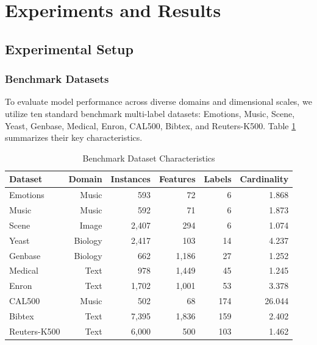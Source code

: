 \documentclass[conference]{IEEEtran}
\begin{document}
\section{Experiments and Results}

\subsection{Experimental Setup}
\subsubsection{Benchmark Datasets}
To evaluate model performance across diverse domains and dimensional scales, we utilize ten standard benchmark multi-label datasets: Emotions, Music, Scene, Yeast, Genbase, Medical, Enron, CAL500, Bibtex, and Reuters-K500. Table \ref{tab:datasets} summarizes their key characteristics.

\begin{table}[htbp]
\caption{Benchmark Dataset Characteristics}
\label{tab:datasets}
\centering
\begin{tabular}{lrrrrr}
\toprule
\textbf{Dataset} & \textbf{Domain} & \textbf{Instances} & \textbf{Features} & \textbf{Labels} & \textbf{Cardinality} \\
\midrule
Emotions & Music & 593 & 72 & 6 & 1.868 \\
Music & Music & 592 & 71 & 6 & 1.873 \\
Scene & Image & 2,407 & 294 & 6 & 1.074 \\
Yeast & Biology & 2,417 & 103 & 14 & 4.237 \\
Genbase & Biology & 662 & 1,186 & 27 & 1.252 \\
Medical & Text & 978 & 1,449 & 45 & 1.245 \\
Enron & Text & 1,702 & 1,001 & 53 & 3.378 \\
CAL500 & Music & 502 & 68 & 174 & 26.044 \\
Bibtex & Text & 7,395 & 1,836 & 159 & 2.402 \\
Reuters-K500 & Text & 6,000 & 500 & 103 & 1.462 \\
\bottomrule
\end{tabular}
\end{table}
\end{document}
